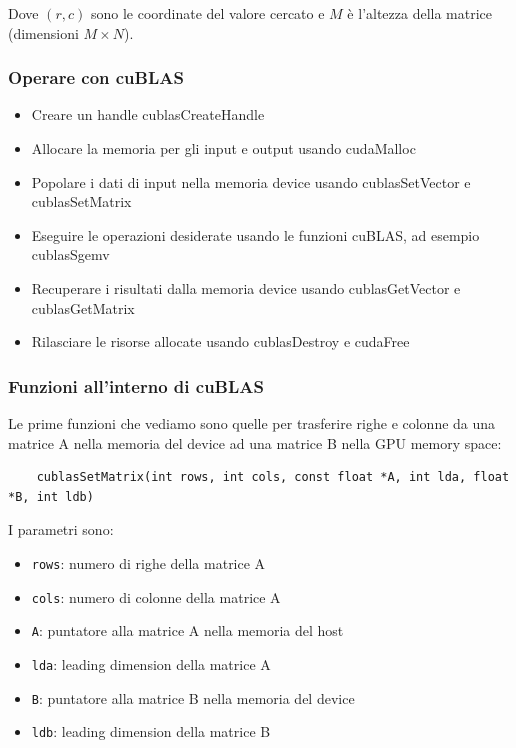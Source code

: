 Dove $(r,c)$ sono le coordinate del valore cercato e $M$ è l'altezza della matrice (dimensioni $M \times N$).

\subsubsection{Operare con cuBLAS}
\begin{itemize}
    \item Creare un handle cublasCreateHandle
    \item Allocare la memoria per gli input e output usando cudaMalloc
    \item Popolare i dati di input nella memoria device usando cublasSetVector e cublasSetMatrix
    \item Eseguire le operazioni desiderate usando le funzioni cuBLAS, ad esempio cublasSgemv
    \item Recuperare i risultati dalla memoria device usando cublasGetVector e cublasGetMatrix
    \item Rilasciare le risorse allocate usando cublasDestroy e cudaFree
\end{itemize}

\subsubsection{Funzioni all'interno di cuBLAS}
Le prime funzioni che vediamo sono quelle per trasferire righe e colonne da una matrice A nella memoria del device ad una matrice B nella GPU memory space:
\begin{lstlisting}
    cublasSetMatrix(int rows, int cols, const float *A, int lda, float *B, int ldb)
\end{lstlisting}

I parametri sono:
\begin{itemize}
    \item \texttt{rows}: numero di righe della matrice A
    \item \texttt{cols}: numero di colonne della matrice A
    \item \texttt{A}: puntatore alla matrice A nella memoria del host
    \item \texttt{lda}: leading dimension della matrice A
    \item \texttt{B}: puntatore alla matrice B nella memoria del device
    \item \texttt{ldb}: leading dimension della matrice B
\end{itemize}

